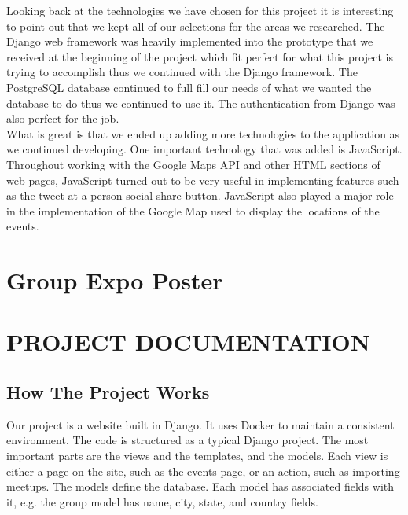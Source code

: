 \documentclass[draftclsnofoot,10pt,onecolumn]{IEEEtran} %
\begin{document}
Looking back at the technologies we have chosen for this project it is interesting to point out that we kept all of our selections 
for the areas we researched. The Django web framework was heavily implemented into the prototype that we received at the 
beginning of the project which fit perfect for what this project is trying to accomplish thus we continued with the Django
framework. The PostgreSQL database continued to full fill our needs of what we wanted the database to do thus we continued 
to use it. The authentication from Django was also perfect for the job. \\

What is great is that we ended up adding more technologies to the application as we continued developing. One important 
technology that was added is JavaScript. Throughout working with the Google Maps API and other HTML sections of web pages, 
JavaScript turned out to be very useful in implementing features such as the tweet at a person social share button. JavaScript 
also played a major role in the implementation of the Google Map used to display the locations of the events. \\

\section{Group Expo Poster}







\section{PROJECT DOCUMENTATION}

\subsection{How The Project Works}
Our project is a website built in Django. It uses Docker to maintain a
consistent environment. The code is structured as a typical Django project. The
most important parts are the views and the templates, and the models. Each view
is either a page on the site, such as the events page, or an action, such as
importing meetups. The models define the database. Each model has associated
fields with it, e.g. the group model has name, city, state, and country fields.\\
\end{document}
